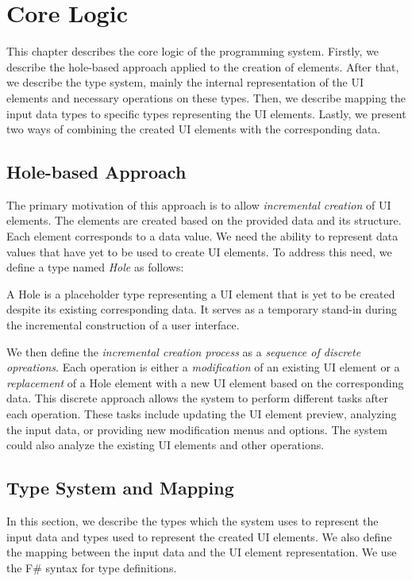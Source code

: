 \chapter{Core Logic}
\label{chap:corelogic}

This chapter describes the core logic of the programming system.
Firstly, we describe the hole-based approach applied to the creation of elements.
After that, we describe the type system, mainly the internal representation of the UI elements and necessary operations on these types.
Then, we describe mapping the input data types to specific types representing the UI elements.
Lastly, we present two ways of combining the created UI elements with the corresponding data.


\section{Hole-based Approach}
\label{sec:hole-based}
The primary motivation of this approach is to allow \emph{incremental creation} of UI elements.
The elements are created based on the provided data and its structure.
Each element corresponds to a data value.
We need the ability to represent data values that have yet to be used to create UI elements.
To address this need, we define a type named \emph{Hole} as follows:
\begin{defn}
	A Hole is a placeholder type representing a UI element that is yet to be created despite its existing corresponding data. It serves as a temporary stand-in during the incremental construction of a user interface.
\end{defn}

We then define the \emph{incremental creation process} as a \emph{sequence of discrete opreations}.
Each operation is either a \emph{modification} of an existing UI element or a \emph{replacement} of a Hole element with a new UI element based on the corresponding data.
This discrete approach allows the system to perform different tasks after each operation.
These tasks include updating the UI element preview, analyzing the input data, or providing new modification menus and options.
The system could also analyze the existing UI elements and other operations.


\section{Type System and Mapping}

In this section, we describe the types which the system uses to represent the input data and types used to represent the created UI elements.
We also define the mapping between the input data and the UI element representation.
We use the F\# syntax for type definitions.

